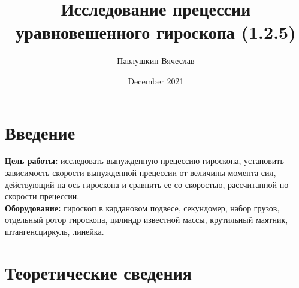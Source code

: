 \documentclass[a4paper,12pt]{article}
\title{\textbf{Исследование прецессии уравновешенного гироскопа (1.2.5)}}
\author{Павлушкин Вячеслав}
\date{December 2021}
\begin{document}
	
	\maketitle
	
	\section{Введение}
	
	\textbf{Цель работы:} исследовать вынужденную прецессию гироскопа, установить зависимость скорости вынужденной прецессии от величины момента сил, действующий на ось гироскопа и сравнить ее со скоростью, рассчитанной по скорости прецессии.\\
	\textbf{Оборудование:} гироскоп в кардановом подвесе, секундомер, набор грузов, отдельный ротор гироскопа, цилиндр известной массы, крутильный маятник, штангенсциркуль, линейка.
	
	\section{Теоретические сведения}
	
\end{document}
